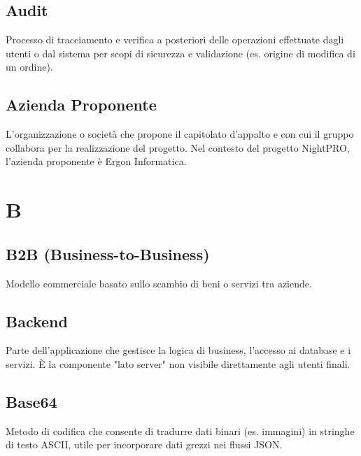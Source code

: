 \documentclass[a4paper, 11pt, oneside]{scrartcl} %
\begin{document}
\subsection*{Audit}
Processo di tracciamento e verifica a posteriori delle operazioni effettuate dagli utenti o dal sistema per scopi di sicurezza e validazione (es. origine di modifica di un ordine).
\vspace{0.5cm}

\subsection*{Azienda Proponente}


L'organizzazione o società che propone il capitolato d'appalto e con cui il gruppo collabora per la realizzazione del progetto. Nel contesto del progetto NightPRO, l'azienda proponente è Ergon Informatica.

\vspace{0.5cm}



\section*{B}


\subsection*{B2B (Business-to-Business)}
Modello commerciale basato sullo scambio di beni o servizi tra aziende.
\vspace{0.5cm}

\subsection*{Backend}


Parte dell'applicazione che gestisce la logica di business, l'accesso ai database e i servizi. È la componente "lato server" non visibile direttamente agli utenti finali.

\vspace{0.5cm}

\subsection*{Base64}
Metodo di codifica che consente di tradurre dati binari (es. immagini) in stringhe di testo ASCII, utile per incorporare dati grezzi nei flussi JSON.
\vspace{0.5cm}
\end{document}

